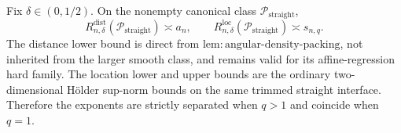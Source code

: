Fix \(\delta\in(0,1/2)\). On the nonempty canonical class \(\mathcal{P}_{\mathrm{straight}}\),
\[
R_{n,\delta}^{\mathrm{dist}}(\mathcal{P}_{\mathrm{straight}})\asymp a_n,\qquad R_{n,\delta}^{\mathrm{loc}}(\mathcal{P}_{\mathrm{straight}})\asymp s_{n,q}.
\]
The distance lower bound is direct from \(\mathrm{lem:angular\text{-}density\text{-}packing}\), not inherited from the larger smooth class, and remains valid for its affine-regression hard family. The location lower and upper bounds are the ordinary two-dimensional H\"older sup-norm bounds on the same trimmed straight interface. Therefore the exponents are strictly separated when \(q>1\) and coincide when \(q=1\).